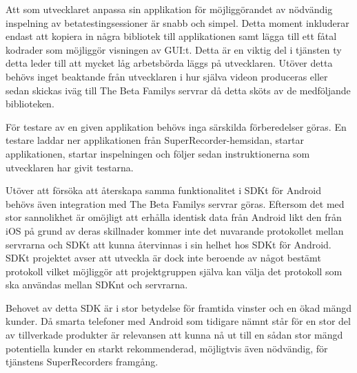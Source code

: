 Att som utvecklaret anpassa sin applikation för möjliggörandet av nödvändig inspelning av betatestingsessioner är snabb och simpel. Detta moment inkluderar endast att kopiera in några bibliotek till applikationen samt lägga till ett fåtal kodrader som möjliggör visningen av GUI:t\parencite{https://thebetafamily.com/superrecorder/installation}. Detta är en viktig del i tjänsten ty detta leder till att mycket låg arbetsbörda läggs på utvecklaren. Utöver detta behövs inget beaktande från utvecklaren i hur själva videon produceras eller sedan skickas iväg till The Beta Familys servrar då detta sköts av de medföljande biblioteken. 

För testare av en given applikation behövs inga särskilda förberedelser göras. En testare laddar ner applikationen från SuperRecorder-hemsidan, startar applikationen, startar inspelningen och följer sedan instruktionerna som utvecklaren har givit testarna. 

Utöver att försöka att återskapa samma funktionalitet i SDKt för Android behövs även integration med The Beta Familys servrar göras. Eftersom det med stor sannolikhet är omöjligt att erhålla identisk data från Android likt den från iOS på grund av deras skillnader kommer inte det nuvarande protokollet mellan servrarna och SDKt att kunna återvinnas i sin helhet hos SDKt för Android. SDKt projektet avser att utveckla är dock inte beroende av något bestämt protokoll vilket möjliggör att projektgruppen själva kan välja det protokoll som ska användas mellan SDKnt och servrarna.

Behovet av detta SDK är i stor betydelse för framtida vinster och en ökad mängd kunder. Då smarta telefoner med Android som tidigare nämnt står för en stor del av tillverkade produkter är relevansen att kunna nå ut till en sådan stor mängd potentiella kunder en starkt rekommenderad, möjligtvis även nödvändig, för tjänstens SuperRecorders framgång.

